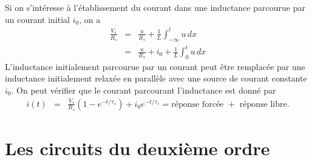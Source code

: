 \begin{marginfigure}
	\centering
	
	\caption{Modélisation d'une inductance initialement parcourue par un courant.}
\end{marginfigure}
Si on s'intéresse à l'établissement du courant dans une inductance parcourue par un courant initial $i_0$, on a
\begin{eqnarray*}
	\frac{V_s}{R_s} & =& \frac{u}{R_s}+\frac{1}{L}\int_{-\infty}^t u\,  dx\\
	& = & \frac{u}{R_s}+i_0+\frac{1}{L}\int_{0}^t u\,  dx
\end{eqnarray*}
L'inductance initialement parcourue par un courant peut être remplacée par une
inductance initialement relaxée en parallèle avec une source de courant
constante $i_0$.
On peut vérifier que le courant parcourant l'inductance est donné par 
\begin{eqnarray*}
	i(t) & = & \frac{V_s}{R_s}(1- e^{-t/\tau_s}) + i_0 e^{-t/\tau_s}= 
	\text{réponse forcée~}+ \text{~réponse libre}.
\end{eqnarray*}



\section{Les circuits du deuxième ordre}
